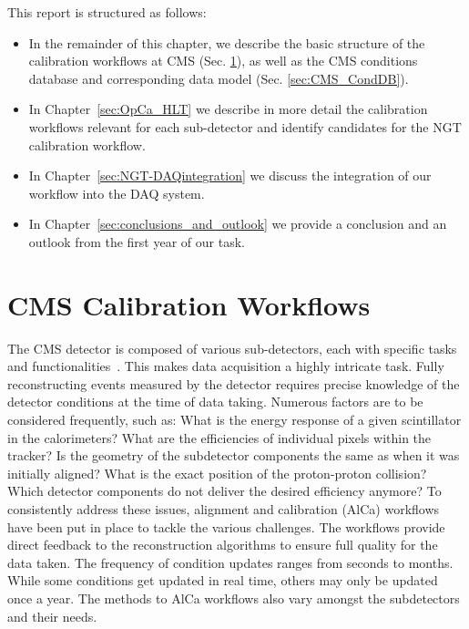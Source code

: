 This report is structured as follows:
\begin{itemize}
    \item In the remainder of this chapter, we describe the basic structure of the calibration workflows at CMS (Sec. \ref{sec:CMScalibration}), as well as the CMS conditions database and corresponding data model (Sec. \ref{sec:CMS_CondDB}).
    \item In Chapter~\ref{sec:OpCa_HLT} we describe in more detail the calibration workflows relevant for each sub-detector and identify candidates for the NGT calibration workflow.
    \item In Chapter~\ref{sec:NGT-DAQintegration} we discuss the integration of our workflow into the DAQ system.
    \item In Chapter~\ref{sec:conclusions_and_outlook} we provide a conclusion and an outlook from the first year of our task.
\end{itemize}

\section{CMS Calibration Workflows}\label{sec:CMScalibration}
The CMS detector is composed of various sub-detectors, each with specific tasks and functionalities~\cite{CMS:2008xjf,CMS:2023gfb}.
This makes data acquisition a highly intricate task. Fully reconstructing events measured by the detector requires precise knowledge of the detector conditions at the time of data taking. Numerous factors are to be considered frequently, such as: What is the energy response of a given scintillator in the calorimeters? What are the efficiencies of individual pixels within the tracker? Is the geometry of the subdetector components the same as when it was initially aligned?
What is the exact position of the proton-proton collision? Which detector components do not deliver the desired efficiency anymore? To consistently address these issues, alignment and calibration (AlCa) workflows have been put in place to tackle the various challenges. The workflows provide direct feedback to the reconstruction algorithms to ensure full quality for the data taken. The frequency of condition updates ranges from seconds to months. While some conditions get updated in real time, others may only be updated once a year. The methods to AlCa workflows also vary amongst the subdetectors and their needs.

